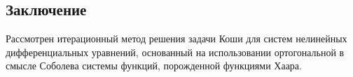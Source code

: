 \subsection{Заключение}

Рассмотрен итерационный метод решения задачи Коши для систем нелинейных дифференциальных уравнений, основанный на использовании ортогональной в смысле Соболева системы функций, порожденной функциями Хаара.